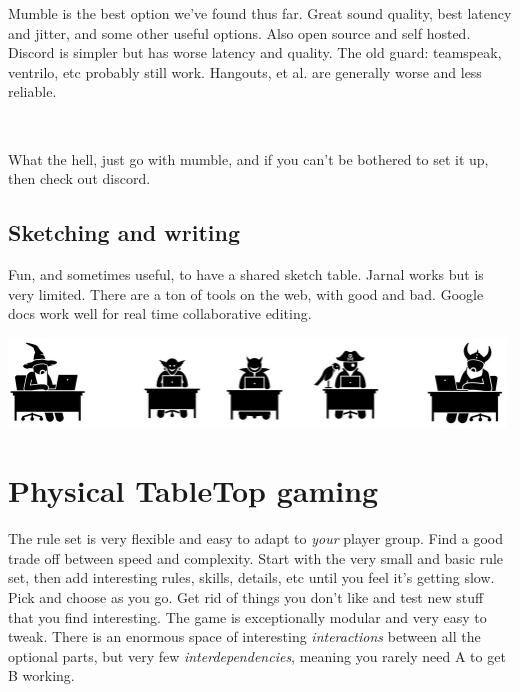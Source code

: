 Mumble is the best option we've found thus far. Great sound quality, best latency and jitter, and some other useful options. Also open source and self hosted. Discord is simpler but has worse latency and quality. The old guard: teamspeak, ventrilo, etc probably still work. Hangouts, et al. are generally worse and less reliable.

\

What the hell, just go with mumble, and if you can't be bothered to set it up, then check out discord.


\subsection*{Sketching and writing} 

Fun, and sometimes useful, to have a shared sketch table. Jarnal works but is very limited. There are a ton of tools on the web, with good and bad. Google docs work well for real time collaborative editing.


\vfill

\begin{center}
\includegraphics[width=0.99\textwidth]{./fig/online-warriors.png}
\end{center}








\clearpage %

\section*{Physical TableTop gaming}

The rule set is very flexible and easy to adapt to \emph{your} player group. Find a good trade off between speed and complexity. Start with the very small and basic rule set, then add interesting rules, skills, details, etc until you feel it's getting slow. Pick and choose as you go. Get rid of things you don't like and test new stuff that you find interesting. The game is exceptionally modular and very easy to tweak. There is an enormous space of interesting \emph{interactions} between all the optional parts, but very few \emph{interdependencies}, meaning you rarely need A to get B working.


